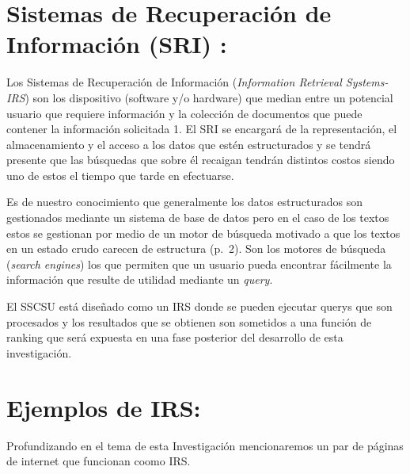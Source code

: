 \documentclass[
  10,
  spanish,
  openany]{book}
\begin{document}
\hypertarget{SRI}{%
\section{Sistemas de Recuperación de Información (SRI) :}\label{SRI}}

Los Sistemas de Recuperación de Información (\emph{Information Retrieval Systems-IRS}) son los dispositivo (software y/o hardware) que median entre un potencial usuario que requiere información y la colección de documentos que puede contener la información solicitada \citep{kraft2017} 1. El SRI se encargará de la representación, el almacenamiento y el acceso a los datos que estén estructurados y se tendrá presente que las búsquedas que sobre él recaigan tendrán distintos costos siendo uno de estos el tiempo que tarde en efectuarse.

Es de nuestro conocimiento que generalmente los datos estructurados son gestionados mediante un sistema de base de datos pero en el caso de los textos estos se gestionan por medio de un motor de búsqueda motivado a que los textos en un estado crudo carecen de estructura \citep{miningt2012} (p.~2). Son los motores de búsqueda (\emph{search engines}) los que permiten que un usuario pueda encontrar fácilmente la información que resulte de utilidad mediante un \emph{query}.

El SSCSU está diseñado como un IRS donde se pueden ejecutar querys que son procesados y los resultados que se obtienen son sometidos a una función de ranking que será expuesta en una fase posterior del desarrollo de esta investigación.

\hypertarget{ejemplos-de-irs}{%
\section{Ejemplos de IRS:}\label{ejemplos-de-irs}}

Profundizando en el tema de esta Investigación mencionaremos un par de páginas de internet que funcionan coomo IRS.
\end{document}
